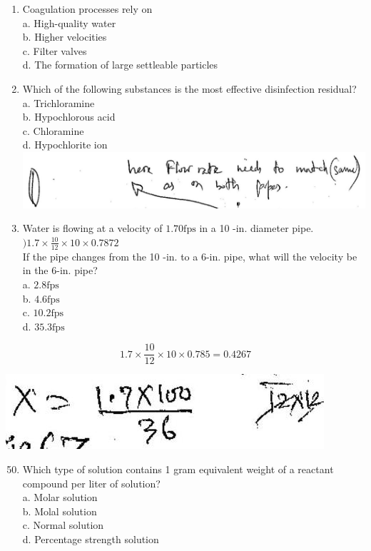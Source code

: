 \documentclass[10pt]{article}
\begin{document}
\begin{enumerate}
  \item Coagulation processes rely on\\
a. High-quality water\\
b. Higher velocities\\
c. Filter valves\\
d. The formation of large settleable particles

  \item Which of the following substances is the most effective disinfection residual?\\
a. Trichloramine\\
b. Hypochlorous acid\\
c. Chloramine\\
d. Hypochlorite ion\\

\includegraphics[max width=\textwidth]{2022_11_11_ca6a6c1a0324ee23e523g-59}

  \item Water is flowing at a velocity of $1.70 \mathrm{fps}$ in a 10 -in. diameter pipe. $) 1.7 \times \frac{10}{12} \times 10 \times 0.7872$\\
If the pipe changes from the 10 -in. to a 6-in. pipe, what will the velocity be in the 6-in. pipe?\\
a. $2.8 \mathrm{fps}$\\
b. $4.6 \mathrm{fps}$\\
c. $10.2 \mathrm{fps}$\\
d. $35.3 \mathrm{fps}$

\end{enumerate}

$$
1.7 \times \frac{10}{12} \times 10 \times 0.785=0.4267
$$

\includegraphics[max width=\textwidth]{2022_11_11_ca6a6c1a0324ee23e523g-59(1)}

\begin{enumerate}
  \setcounter{enumi}{49}
  \item Which type of solution contains 1 gram equivalent weight of a reactant compound per liter of solution?\\
a. Molar solution\\
b. Molal solution\\
c. Normal solution\\
d. Percentage strength solution
\end{enumerate}
\end{document}
